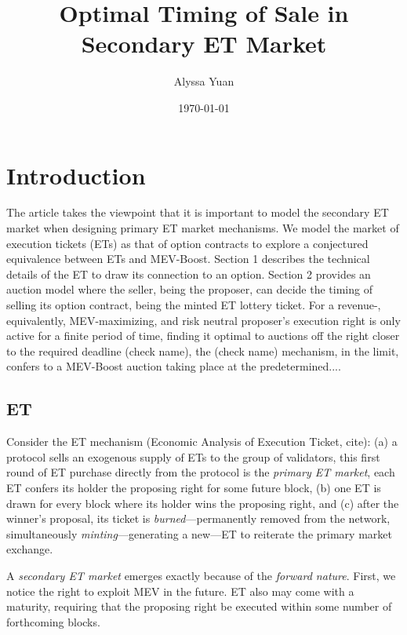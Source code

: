 \documentclass[a4paper,11pt]{article}
\title{Optimal Timing of Sale in Secondary ET Market}
\author{Alyssa Yuan}
\date{\today}
\begin{document}
\maketitle 
\section{Introduction}
The article takes the viewpoint that it is important to model the secondary ET market when designing primary ET market mechanisms. We model the market of execution tickets (ETs) as that of option contracts to explore a conjectured equivalence between ETs and MEV-Boost. Section 1 describes the technical details of the ET to draw its connection to an option. Section 2 provides an auction model where the seller, being the proposer, can decide the timing of selling its option contract, being the minted ET lottery ticket. For a revenue-, equivalently, MEV-maximizing, and risk neutral proposer's execution right is only active for a finite period of time, finding it optimal to auctions off the right closer to the required deadline (check name), the (check name) mechanism, in the limit, confers to a MEV-Boost auction taking place at the predetermined.... 

\subsection{ET}
Consider the ET mechanism (Economic Analysis of Execution Ticket, cite): (a) a protocol sells an exogenous supply of ETs to the group of validators, this first round of ET purchase directly from the protocol is the \textit{primary ET market}, each ET confers its holder the proposing right for some future block, (b) one ET is drawn for every block where its holder wins the proposing right, and (c) after the winner's proposal, its ticket is \textit{burned}---permanently removed from the network, simultaneously \textit{minting}---generating a new---ET to reiterate the primary market exchange. 

A \textit{secondary ET market} emerges exactly because of the \textit{forward nature}. First, we notice the right to exploit MEV in the future. ET also may come with a maturity, requiring that the proposing right be executed within some number of forthcoming blocks. 
\end{document}
